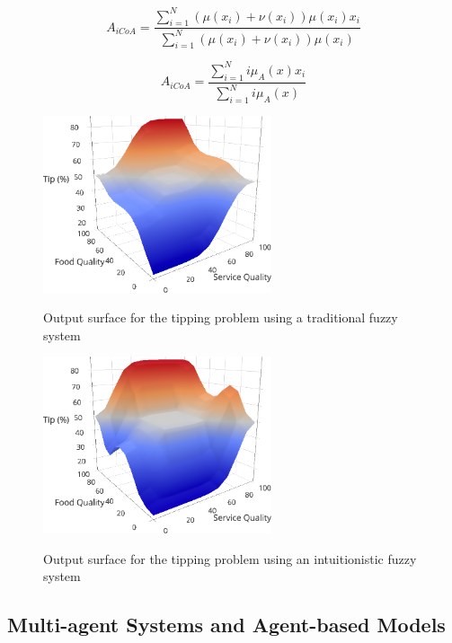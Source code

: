 \documentclass[review]{elsarticle}
\begin{document}
\begin{equation}
  \label{if-coa}
  A_{iCoA} = \dfrac{\sum_{i=1}^{N} (\mu(x_{i}) + \nu(x_{i})) \mu(x_{i})
    x_{i}}{\sum_{i=1}^{N} (\mu(x_{i}) + \nu(x_{i})) \mu(x_{i})}
\end{equation}

\begin{equation}
  \label{if-coa-simplified}
  A_{iCoA} = \dfrac{\sum_{i=1}^{N} i\mu_{A}(x) x_{i}}{\sum_{i=1}^{N}
    i\mu_{A}(x)}
\end{equation}

\begin{figure}
\caption{Output surface for the tipping problem using a traditional fuzzy system}
\centering
\includegraphics[width=0.6\textwidth]{img/fis-surface.png}
\label{figure:agent-based-model}
\end{figure}

\begin{figure}
\caption{Output surface for the tipping problem using an intuitionistic fuzzy system}
\centering
\includegraphics[width=0.6\textwidth]{img/ifis-surface.png}
\label{figure:agent-based-model}
\end{figure}

\subsection{Multi-agent Systems and Agent-based Models}
\label{subsection:multi-agent-systems-and-agent-based-models}
\end{document}
